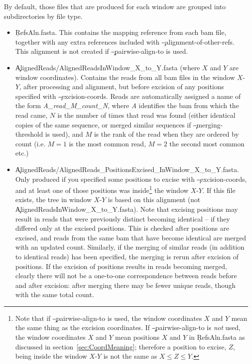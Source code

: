 By default, those files that are produced for each window are grouped into subdirectories by file type.
\begin{itemize}
\item \c{RefsAln.fasta}.
This contains the mapping reference from each bam file, together with any extra references included with \c{--alignment-of-other-refs}.
This alignment is not created if \c{--pairwise-align-to} is used.
\item \c{AlignedReads/AlignedReadsInWindow\_X\_to\_Y.fasta} (where $X$ and $Y$ are window coordinates).
Contains the reads from all bam files in the window $X$-$Y$, after processing and alignment, but before excision of any positions specified with \c{--excision-coords}.
Reads are automatically assigned a name of the form {\it A\_read\_M\_count\_N}, where {\it A} identifies the bam from which the read came, $N$ is the number of times that read was found (either identical copies of the same sequence, or merged similar sequences if \c{--merging-threshold} is used), and $M$ is the rank of the read when they are ordered by count (i.e. $M=1$ is the most common read, $M=2$ the second most common etc.)
\item \c{AlignedReads/AlignedReads\_PositionsExcised\_InWindow\_X\_to\_Y.fasta}.
Only produced if you specified some positions to excise with \c{--excision-coords}, and at least one of those positions was inside\footnote{
Note that if \c{--pairwise-align-to} is used, the window coordinates $X$ and $Y$ mean the same thing as the excision coordinates.
If \c{--pairwise-align-to} is {\it not} used, the window coordinates $X$ and $Y$ mean positions $X$ and $Y$ in \c{RefsAln.fasta} as discussed in section~\ref{sec:CoordMeaning}; therefore a position to excise, $Z$, being inside the window $X$-$Y$ is not the same as $X\leq Z \leq Y$.
} the window $X$-$Y$.
If this file exists, the tree in window $X$-$Y$ is based on this alignment (not \c{AlignedReadsInWindow\_X\_to\_Y.fasta}).
Note that excising positions may result in reads that were previously distinct becoming identical -- if they differed only at the excised positions.
This is checked after positions are excised, and reads from the same bam that have become identical are merged with an updated count.
Similarly, if the merging of similar reads (in addition to identical reads) has been specified, the merging is rerun after excision of positions.
If the excision of positions results in reads becoming merged, clearly there will not be a one-to-one correspondence between reads before and after excision: after merging there may be fewer unique reads, though with the same total count.

\end{itemize}
